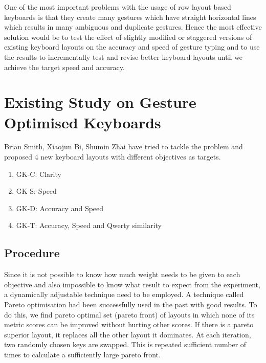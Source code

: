 \documentclass[MTech]{iitmdiss}
\begin{document}
One of the most important problems with the usage of row layout based keyboards is that they create many gestures which have straight horizontal lines which results in many ambiguous and duplicate gestures. Hence the most effective solution would be to test the effect of slightly modified or staggered versions of existing keyboard layouts on the accuracy and speed of gesture typing and to use the results to incrementally test and revise better keyboard layouts until we achieve the target speed and accuracy.


\section{Existing Study on Gesture Optimised Keyboards}
Brian Smith, Xiaojun Bi, Shumin Zhai \citet{gesturerecog} have tried to tackle the problem and proposed 4 new keyboard layouts with different objectives as targets.

\begin{enumerate}
	
	\item GK-C: Clarity
	\item GK-S: Speed
	\item GK-D: Accuracy and Speed
	\item GK-T: Accuracy, Speed and Qwerty similarity
\end{enumerate}


\subsection{Procedure}
Since it is not possible to know how much weight needs to be given to each objective and also impossible to know what result to expect from the experiment, a dynamically adjustable technique need to be employed. A technique called Pareto optimisation had been successfully used in the past with good results. To do this, we find pareto optimal set (pareto front) of layouts in which none of its metric scores can be improved without hurting other scores. If there is a pareto superior layout, it replaces all the other layout it dominates. At each iteration, two randomly chosen keys are swapped. This is repeated sufficient number of times to calculate a sufficiently large pareto front. 
\end{document}
